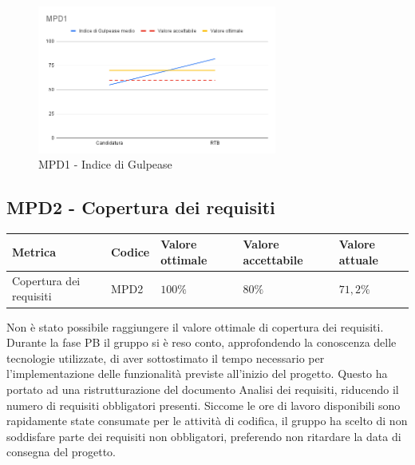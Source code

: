 \begin{figure}[htbp]
    \centering
    \includegraphics[width=0.7\textwidth]{img/MPD1.png}
    \caption{MPD1 - Indice di Gulpease}
    \label{fig:mpd1}
\end{figure}



\subsection{MPD2 - Copertura dei requisiti}
\label{s:mpd2}
\begin{table}[H]
    \centering
    \begin{tabularx}{\textwidth}{X|X|l|l|l}
        \hline
        \textbf{Metrica}        & \textbf{Codice} & \textbf{Valore ottimale} & \textbf{Valore accettabile} & \textbf{Valore attuale} \\
        \hline
        Copertura dei requisiti & MPD2            & $100\%$                  & $80\%$                      & $71,2\%$                \\
        \hline
    \end{tabularx}
\end{table}
Non è stato possibile raggiungere il valore ottimale di copertura dei requisiti.\\
Durante la fase PB il gruppo si è reso conto, approfondendo la conoscenza delle tecnologie utilizzate, di aver sottostimato il tempo necessario per l'implementazione delle funzionalità previste all'inizio del progetto.
Questo ha portato ad una ristrutturazione del documento Analisi dei requisiti, riducendo il numero di requisiti obbligatori presenti.
Siccome le ore di lavoro disponibili sono rapidamente state consumate per le attività di codifica, il gruppo ha scelto di non soddisfare parte dei requisiti non obbligatori, preferendo non ritardare la data di consegna del progetto.
